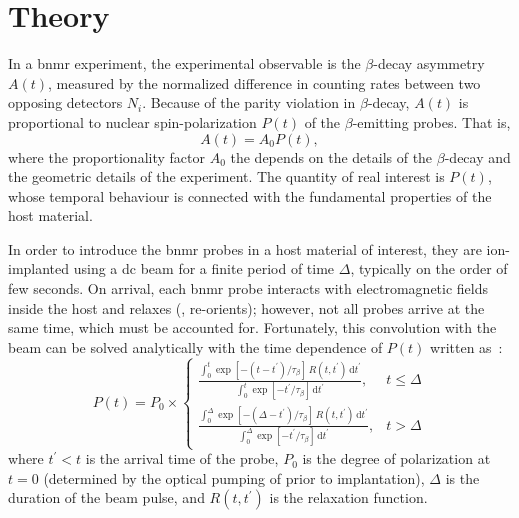 \section{Theory \label{sec:theory}}

In a \gls{bnmr} experiment, the experimental observable is the $\beta$-decay asymmetry $A(t)$, measured by the normalized difference in counting rates between two opposing detectors $N_{i}$.
Because of the parity violation in $\beta$-decay, $A(t)$ is proportional to nuclear spin-polarization $P(t)$ of the $\beta$-emitting probes.
That is,
\begin{equation}
   A(t) = A_{0} P(t),
\end{equation}
where the proportionality factor $A_{0}$ the depends on the details of the $\beta$-decay and the geometric details of the experiment.
The quantity of real interest is $P(t)$, whose temporal behaviour is connected with the fundamental properties of the host material.

In order to introduce the \gls{bnmr} probes in a host material of interest, they are ion-implanted using a \gls{dc} beam for a finite period of time $\Delta$, typically on the order of few seconds.
On arrival, each \gls{bnmr} probe interacts with electromagnetic fields inside the host and relaxes (, re-orients);
however, not all probes arrive at the same time, which must be accounted for.
Fortunately, this convolution with the beam can be solved analytically with the time dependence of $P(t)$ written as~\cite{2006-Salman-PRL-96-147601, 2015-MacFarlane-PRB-92-064409}:
\begin{equation} \label{eq:polarization}
   P(t) = P_{0} \times
   \begin{cases}
      \frac{ \displaystyle \int_{0}^{t} \exp \left [ -\left ( t - t^{\prime} \right ) / \tau_{\beta} \right ] \, R \left (t,t^{\prime} \right ) \, \mathrm{d}t^{\prime} }{ \displaystyle \int_{0}^{t} \exp \left [ -t^{\prime} / \tau_{\beta} \right ] \, \mathrm{d}t^{\prime} }, & t \leq \Delta \\
      \frac{ \displaystyle \int_{0}^{\Delta} \exp \left [ - \left ( \Delta - t^{\prime} \right ) / \tau_{\beta} \right ] \,  R \left (t, t^{\prime} \right ) \, \mathrm{d}t^{\prime} }{ \displaystyle \int_{0}^{\Delta} \exp \left [ -t^{\prime} / \tau_{\beta} \right ] \, \mathrm{d} t^{\prime} }, & t > \Delta
   \end{cases}
\end{equation}
where $t^{\prime} < t$ is the arrival time of the probe, $P_{0}$ is the degree of polarization at $t = 0$ (determined by the optical pumping of  prior to implantation), $\Delta$ is the duration of the beam pulse, and $R \left (t, t^{\prime} \right )$ is the relaxation function.


